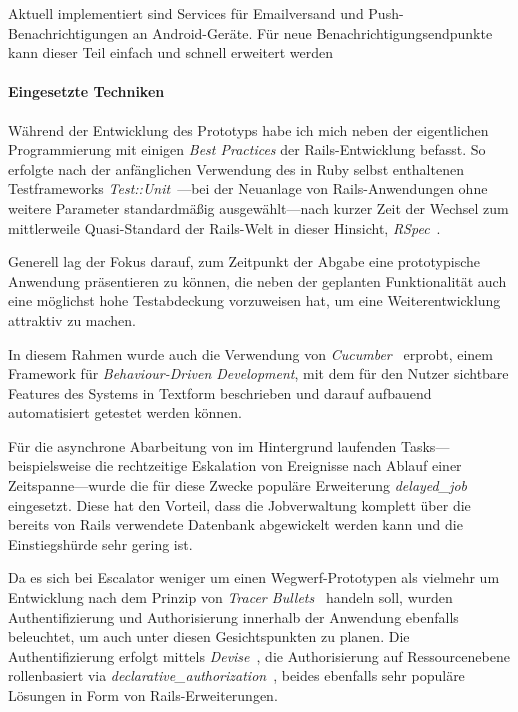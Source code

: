 \documentclass[11pt,utf8,notoc,bibnum,german,final]{zihpub}
\begin{document}
Aktuell implementiert sind Services für Emailversand und
Push-Benachrichtigungen an Android-Geräte. Für neue Benachrichtigungsendpunkte
kann dieser Teil einfach und schnell erweitert werden

\paragraph{Eingesetzte Techniken}

Während der Entwicklung des Prototyps habe ich mich neben der eigentlichen
Programmierung mit einigen \emph{Best Practices} der Rails-Entwicklung befasst.
So erfolgte nach der anfänglichen Verwendung des in Ruby selbst enthaltenen
Testframeworks \emph{Test::Unit}~\cite{testunit}—bei der Neuanlage von
Rails-Anwendungen ohne weitere Parameter standardmäßig ausgewählt—nach kurzer
Zeit der Wechsel zum mittlerweile Quasi-Standard der Rails-Welt in dieser
Hinsicht, \emph{RSpec}~\cite{rspec}.

Generell lag der Fokus darauf, zum Zeitpunkt der Abgabe eine prototypische
Anwendung präsentieren zu können, die neben der geplanten Funktionalität auch
eine möglichst hohe Testabdeckung vorzuweisen hat, um eine Weiterentwicklung
attraktiv zu machen.

In diesem Rahmen wurde auch die Verwendung von \emph{Cucumber}~\cite{cucumber}
erprobt, einem Framework für \emph{Behaviour-Driven Development}, mit dem für
den Nutzer sichtbare Features des Systems in Textform beschrieben und darauf
aufbauend automatisiert getestet werden können.

Für die asynchrone Abarbeitung von im Hintergrund laufenden
Tasks—beispielsweise die rechtzeitige Eskalation von Ereignisse nach Ablauf
einer Zeitspanne—wurde die für diese Zwecke populäre Erweiterung
\emph{delayed\_job}~\cite{delayedjob} eingesetzt. Diese hat den Vorteil, dass
die Jobverwaltung komplett über die bereits von Rails verwendete Datenbank
abgewickelt werden kann und die Einstiegshürde sehr gering ist.

Da es sich bei Escalator weniger um einen Wegwerf-Prototypen als vielmehr um
Entwicklung nach dem Prinzip von \emph{Tracer
Bullets}~\cite[S. 47 ff.]{pragprog-tracerbullets} handeln soll, wurden Authentifizierung
und Authorisierung innerhalb der Anwendung ebenfalls beleuchtet, um auch unter
diesen Gesichtspunkten zu planen.  Die Authentifizierung erfolgt mittels
\emph{Devise}~\cite{devise}, die Authorisierung auf Ressourcenebene
rollenbasiert via
\emph{declarative\_authorization}~\cite{declarative-authorization}, beides
ebenfalls sehr populäre Lösungen in Form von Rails-Erweiterungen.
\end{document}
